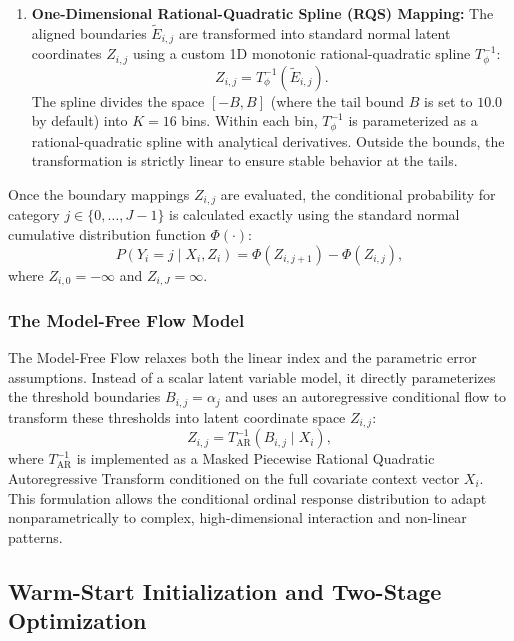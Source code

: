 \documentclass{article}
\numberwithin{figure}{section}
\numberwithin{table}{section}
\numberwithin{equation}{section}
\begin{document}
\begin{enumerate}
    \item \textbf{One-Dimensional Rational-Quadratic Spline (RQS) Mapping:} The aligned boundaries $\tilde{E}_{i,j}$ are transformed into standard normal latent coordinates $Z_{i,j}$ using a custom 1D monotonic rational-quadratic spline $T_\phi^{-1}$:
    \begin{equation}
    Z_{i,j} = T_\phi^{-1}\left( \tilde{E}_{i,j} \right).
    \end{equation}
    The spline divides the space $[-B, B]$ (where the tail bound $B$ is set to $10.0$ by default) into $K = 16$ bins. Within each bin, $T_\phi^{-1}$ is parameterized as a rational-quadratic spline with analytical derivatives. Outside the bounds, the transformation is strictly linear to ensure stable behavior at the tails.
\end{enumerate}

Once the boundary mappings $Z_{i,j}$ are evaluated, the conditional probability for category $j \in \{0, \dots, J-1\}$ is calculated exactly using the standard normal cumulative distribution function $\Phi(\cdot)$:
\begin{equation}
P(Y_i = j \mid X_i, Z_i) = \Phi\left( Z_{i, j+1} \right) - \Phi\left( Z_{i, j} \right),
\end{equation}
where $Z_{i,0} = -\infty$ and $Z_{i,J} = \infty$.

\subsubsection{The Model-Free Flow Model}
The Model-Free Flow relaxes both the linear index and the parametric error assumptions. Instead of a scalar latent variable model, it directly parameterizes the threshold boundaries $B_{i, j} = \alpha_j$ and uses an autoregressive conditional flow to transform these thresholds into latent coordinate space $Z_{i, j}$:
\begin{equation}
Z_{i, j} = T^{-1}_{\text{AR}}\left( B_{i,j} \mid X_i \right),
\end{equation}
where $T^{-1}_{\text{AR}}$ is implemented as a Masked Piecewise Rational Quadratic Autoregressive Transform conditioned on the full covariate context vector $X_i$. This formulation allows the conditional ordinal response distribution to adapt nonparametrically to complex, high-dimensional interaction and non-linear patterns.

\subsection{Warm-Start Initialization and Two-Stage Optimization}
\label{appsub:optimization}
\end{document}
